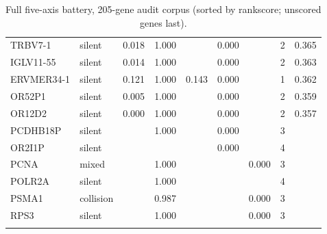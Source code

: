 \begin{longtable}{llrrrrrrr}
TRBV7-1 & silent & 0.018 & 1.000 &  & 0.000 &  & 2 & 0.365\\
IGLV11-55 & silent & 0.014 & 1.000 &  & 0.000 &  & 2 & 0.363\\
ERVMER34-1 & silent & 0.121 & 1.000 & 0.143 & 0.000 &  & 1 & 0.362\\
OR52P1 & silent & 0.005 & 1.000 &  & 0.000 &  & 2 & 0.359\\
OR12D2 & silent & 0.000 & 1.000 &  & 0.000 &  & 2 & 0.357\\
PCDHB18P & silent &  & 1.000 &  & 0.000 &  & 3 & \\
OR2I1P & silent &  &  &  & 0.000 &  & 4 & \\
PCNA & mixed &  & 1.000 &  &  & 0.000 & 3 & \\
POLR2A & silent &  & 1.000 &  &  &  & 4 & \\
PSMA1 & collision &  & 0.987 &  &  & 0.000 & 3 & \\
RPS3 & silent &  & 1.000 &  &  & 0.000 & 3 & \\
\hline\hline\caption{Full five-axis battery, 205-gene audit corpus (sorted by rankscore; unscored genes last).}\label{tab:batteryfull}\end{longtable}
